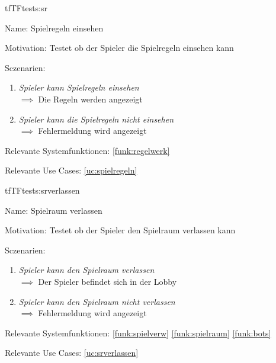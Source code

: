 \begin{description}[leftmargin=5em, style=sameline]

\begin{lhp}{tf}{TF}{tests:sr}
	\item [Name:] Spielregeln einsehen
	\item [Motivation:] Testet ob der Spieler die Spielregeln einsehen kann
	\item [Sczenarien:] \hfill
		\begin{enumerate}
			\item \textit{ Spieler kann Spielregeln einsehen} \\ $\implies$ Die Regeln werden angezeigt
			
			\item \textit{Spieler kann die Spielregeln nicht einsehen } \\ $\implies$ Fehlermeldung wird angezeigt
			
			
		\end{enumerate}
	\item [Relevante Systemfunktionen:] \ref{funk:regelwerk}
	\item [Relevante Use Cases:] \ref{uc:spielregeln}
\end{lhp}

\end{description}





\begin{description}[leftmargin=5em, style=sameline]

\begin{lhp}{tf}{TF}{tests:srverlassen}
	\item [Name:] Spielraum verlassen
	\item [Motivation:] Testet ob der Spieler den Spielraum verlassen kann
	\item [Sczenarien:] \hfill
		\begin{enumerate}
			\item \textit{Spieler kann den Spielraum verlassen } \\ $\implies$ Der Spieler befindet sich in der Lobby
			\item \textit{Spieler kann den Spielraum nicht verlassen } \\ $\implies$ Fehlermeldung wird angezeigt
			
		\end{enumerate}
	\item [Relevante Systemfunktionen:] \ref{funk:spielverw} \ref{funk:spielraum} \ref{funk:bots}
	\item [Relevante Use Cases:] \ref{uc:srverlassen}
\end{lhp}

\end{description}




